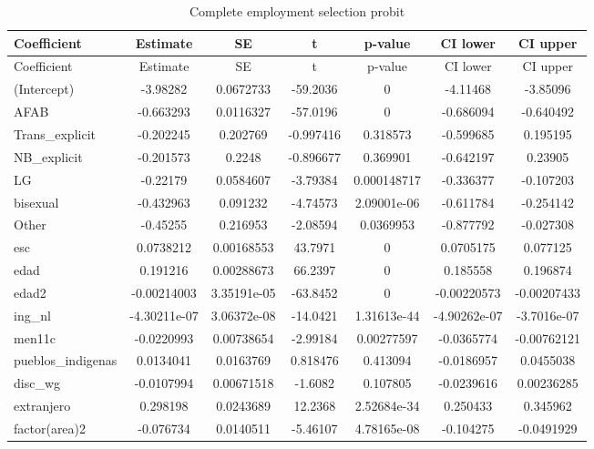 \begin{landscape}
\begingroup\scriptsize
\begin{longtable}{l c c c c c c}
\caption{Complete employment selection probit}\label{tab:wages_trans_nb_selection} \\
\hline
Coefficient & Estimate & SE & t & p-value & CI lower & CI upper \\
\hline
\endfirsthead
\hline
Coefficient & Estimate & SE & t & p-value & CI lower & CI upper \\
\hline
\endhead
\hline\endfoot
(Intercept) & -3.98282 & 0.0672733 & -59.2036 &       0 & -4.11468 & -3.85096 \\
AFAB & -0.663293 & 0.0116327 & -57.0196 &       0 & -0.686094 & -0.640492 \\
Trans\_explicit & -0.202245 & 0.202769 & -0.997416 & 0.318573 & -0.599685 & 0.195195 \\
NB\_explicit & -0.201573 &  0.2248 & -0.896677 & 0.369901 & -0.642197 & 0.23905 \\
LG & -0.22179 & 0.0584607 & -3.79384 & 0.000148717 & -0.336377 & -0.107203 \\
bisexual & -0.432963 & 0.091232 & -4.74573 & 2.09001e-06 & -0.611784 & -0.254142 \\
Other & -0.45255 & 0.216953 & -2.08594 & 0.0369953 & -0.877792 & -0.027308 \\
esc & 0.0738212 & 0.00168553 & 43.7971 &       0 & 0.0705175 & 0.077125 \\
edad & 0.191216 & 0.00288673 & 66.2397 &       0 & 0.185558 & 0.196874 \\
edad2 & -0.00214003 & 3.35191e-05 & -63.8452 &       0 & -0.00220573 & -0.00207433 \\
ing\_nl & -4.30211e-07 & 3.06372e-08 & -14.0421 & 1.31613e-44 & -4.90262e-07 & -3.7016e-07 \\
men11c & -0.0220993 & 0.00738654 & -2.99184 & 0.00277597 & -0.0365774 & -0.00762121 \\
pueblos\_indigenas & 0.0134041 & 0.0163769 & 0.818476 & 0.413094 & -0.0186957 & 0.0455038 \\
disc\_wg & -0.0107994 & 0.00671518 & -1.6082 & 0.107805 & -0.0239616 & 0.00236285 \\
extranjero & 0.298198 & 0.0243689 & 12.2368 & 2.52684e-34 & 0.250433 & 0.345962 \\
factor(area)2 & -0.076734 & 0.0140511 & -5.46107 & 4.78165e-08 & -0.104275 & -0.0491929 \\

\end{longtable}
\end{landscape}
